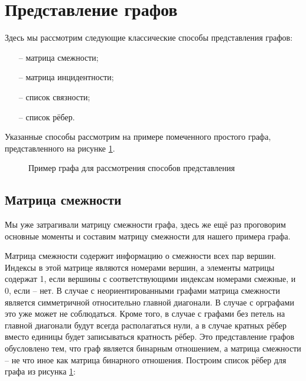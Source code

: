 \section{Представление графов}

Здесь мы рассмотрим следующие классические способы представления графов:
\begin{itemize}
	\item[--] матрица смежности;
	\item[--] матрица инцидентности;
	\item[--] список связности;
	\item[--] список рёбер.
\end{itemize}

Указанные способы рассмотрим на примере помеченного простого графа, 
представленного на рисунке \ref{example of a graph}.

\begin{figure}[h]
	\center
	\caption{Пример графа для рассмотрения способов представления}
	\label{example of a graph}
\end{figure}

\subsection{Матрица смежности}

Мы уже затрагивали матрицу смежности графа, здесь же ещё раз проговорим основные
моменты и составим матрицу смежности для нашего примера графа.

Матрица смежности содержит информацию о смежности всех пар вершин. Индексы в 
этой матрице являются номерами вершин, а элементы матрицы содержат 1, если 
вершины с соответствующими индексам номерами смежные, и 0, если – нет. В случае 
с неориентированными графами матрица смежности является симметричной 
относительно главной диагонали. В случае с орграфами это уже может не 
соблюдаться. Кроме того, в случае с графами без петель на главной диагонали 
будут всегда располагаться нули, а в случае кратных рёбер вместо единицы будет 
записываться кратность рёбер. Это представление графов обусловлено тем, что 
граф является бинарным отношением, а матрица смежности – не что иное как 
матрица бинарного отношения. Построим список рёбер для графа из рисунка 
\ref{example of a graph}:

